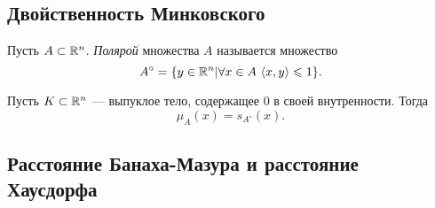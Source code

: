 \subsection{Двойственность Минковского}
\begin{defin}
	Пусть $A\subset\mathbb {R}^n$. \textit{Полярой} множества $A$ называется множество
		\begin{equation}
			A^{\circ}=\{y\in\mathbb {R}^n|\forall x\in A\ \langle x,y\rangle\leqslant 1\}.
		\end{equation}
\end{defin}
\begin{prop}
	Пусть $K\subset\mathbb {R}^n$ --- выпуклое тело, содержащее 0 в своей внутренности. Тогда
		\begin{equation}
			\mu_A(x)=s_{A^{\circ}}(x).
		\end{equation}
\end{prop}

\subsection{Расстояние Банаха-Мазура и расстояние Хаусдорфа}
